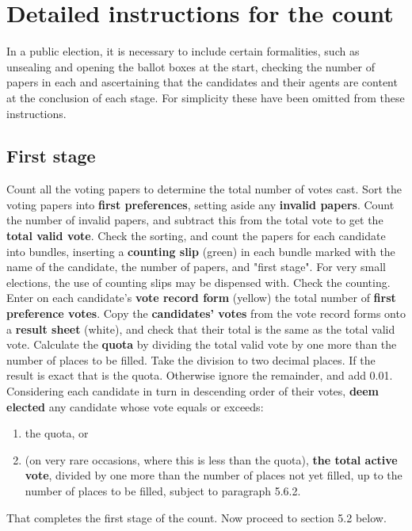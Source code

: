 \section{Detailed instructions for the count}

In a public election, it is necessary to include certain formalities, such as unsealing and opening the ballot boxes at the start, checking the number of papers in each and ascertaining that the candidates and their agents are content at the conclusion of each stage. For simplicity these have been omitted from these instructions.

\subsection{First stage}
\appnpara Count all the voting papers to determine the total number of votes cast.
\appnpara Sort the voting papers into \textbf{first preferences}, setting aside any \textbf{invalid papers}. Count the number of invalid papers, and subtract this from the total vote to get the \textbf{total valid vote}.
\appnpara Check the sorting, and count the papers for each candidate into bundles, inserting a \textbf{counting slip }(green) in each bundle marked with the name of the candidate, the number of papers, and "first stage". For very small elections, the use of counting slips may be dispensed with.
\appnpara Check the counting. Enter on each candidate’s \textbf{vote record form} (yellow) the total number of\textbf{ first preference votes}.
\appnpara Copy the \textbf{candidates' votes} from the vote record forms onto a\textbf{ result sheet} (white), and check that their total is the same as the total valid vote.
\appnpara Calculate the \textbf{quota} by dividing the total valid vote by one more than the number of places to be filled. Take the division to two decimal places. If the result is exact that is the quota. Otherwise ignore the remainder, and add 0.01.
\appnpara Considering each candidate in turn in descending order of their votes,\textbf{ deem elected} any candidate whose vote equals or exceeds:

\begin{enumerate}
    \item the quota, or
    \item (on very rare occasions, where this is less than the quota), \textbf{the total active vote}, divided by one more than the number of places not yet filled, up to the number of places to be filled, subject to paragraph 5.6.2.
\end{enumerate}
\appnpara That completes the first stage of the count. Now proceed to section 5.2 below.

